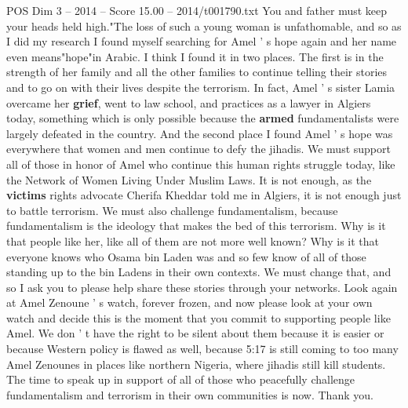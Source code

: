 \begin{textsample}{POS Dim 3 – 2014 – Score 15.00 – 2014/t001790.txt}
You and father must keep your heads held high."The loss of such a young woman is unfathomable, and so as I did my research I found myself searching for Amel ' s hope again and her name even means"hope"in Arabic.
I think I found it in two places.
The first is in the strength of her family and all the other families to continue telling their stories and to go on with their lives despite the terrorism.
In fact, Amel ' s sister Lamia overcame her \textbf{grief}, went to law school, and practices as a lawyer in Algiers today, something which is only possible because the \textbf{armed} fundamentalists were largely defeated in the country.
And the second place I found Amel ' s hope was everywhere that women and men continue to defy the jihadis.
We must support all of those in honor of Amel who continue this human rights struggle today, like the Network of Women Living Under Muslim Laws.
It is not enough, as the \textbf{victims} rights advocate Cherifa Kheddar told me in Algiers, it is not enough just to battle terrorism.
We must also challenge fundamentalism, because fundamentalism is the ideology that makes the bed of this terrorism.
Why is it that people like her, like all of them are not more well known?
Why is it that everyone knows who Osama bin Laden was and so few know of all of those standing up to the bin Ladens in their own contexts.
We must change that, and so I ask you to please help share these stories through your networks.
Look again at Amel Zenoune ' s watch, forever frozen, and now please look at your own watch and decide this is the moment that you commit to supporting people like Amel.
We don ' t have the right to be silent about them because it is easier or because Western policy is flawed as well, because 5:17 is still coming to too many Amel Zenounes in places like northern Nigeria, where jihadis still kill students.
The time to speak up in support of all of those who peacefully challenge fundamentalism and terrorism in their own communities is now.
Thank you.

\end{textsample}
